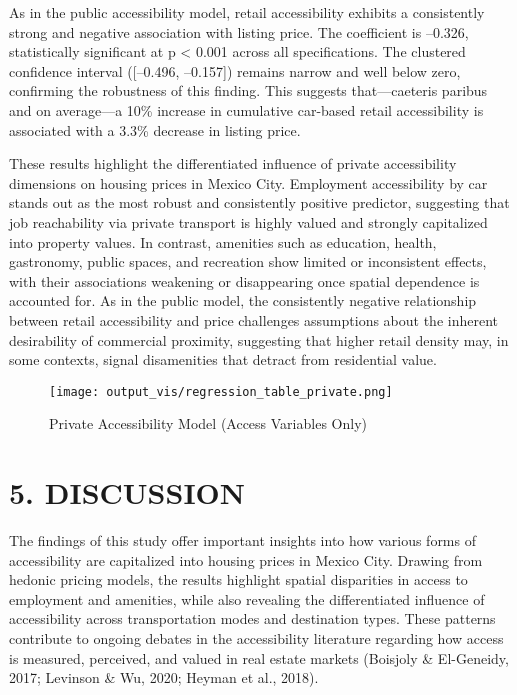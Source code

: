 \documentclass[
  12pt,
]{report}
\begin{document}
As in the public accessibility model, retail accessibility exhibits a
consistently strong and negative association with listing price. The
coefficient is --0.326, statistically significant at p \textless{} 0.001
across all specifications. The clustered confidence interval
({[}--0.496, --0.157{]}) remains narrow and well below zero, confirming
the robustness of this finding. This suggests that---caeteris paribus
and on average---a 10\% increase in cumulative car-based retail
accessibility is associated with a 3.3\% decrease in listing price.

These results highlight the differentiated influence of private
accessibility dimensions on housing prices in Mexico City. Employment
accessibility by car stands out as the most robust and consistently
positive predictor, suggesting that job reachability via private
transport is highly valued and strongly capitalized into property
values. In contrast, amenities such as education, health, gastronomy,
public spaces, and recreation show limited or inconsistent effects, with
their associations weakening or disappearing once spatial dependence is
accounted for. As in the public model, the consistently negative
relationship between retail accessibility and price challenges
assumptions about the inherent desirability of commercial proximity,
suggesting that higher retail density may, in some contexts, signal
disamenities that detract from residential value.

\begin{figure}[H]

{\centering \texttt{[image: output\_vis/regression\_table\_private.png]}

}

\caption{Private Accessibility Model (Access Variables Only)}

\end{figure}%

\newpage

\chapter{5. DISCUSSION}\label{discussion}

The findings of this study offer important insights into how various
forms of accessibility are capitalized into housing prices in Mexico
City. Drawing from hedonic pricing models, the results highlight spatial
disparities in access to employment and amenities, while also revealing
the differentiated influence of accessibility across transportation
modes and destination types. These patterns contribute to ongoing
debates in the accessibility literature regarding how access is
measured, perceived, and valued in real estate markets (Boisjoly \&
El-Geneidy, 2017; Levinson \& Wu, 2020; Heyman et al., 2018).
\end{document}
